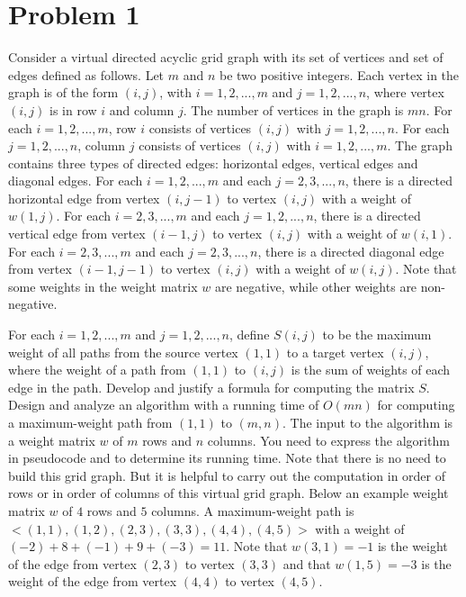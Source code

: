 \documentclass[12pt]{article}
\begin{document}
\section*{Problem 1}

Consider a virtual directed acyclic grid graph with its set of vertices and set of edges
defined as follows. Let $m$ and $n$ be two positive integers.
Each vertex in the graph is of the form $(i, j)$,
with $i = 1, 2, ..., m$ and $j = 1, 2, ..., n$, where vertex $(i, j)$
is in row $i$ and column $j$. The number of vertices in the graph is $mn$.
For each $i = 1, 2, ..., m$, row $i$ consists of 
vertices $(i, j)$ with $j = 1, 2, ..., n$.
For each $j = 1, 2, ..., n$, column $j$
consists of vertices $(i, j)$ with $i = 1, 2, ..., m$.
The graph contains three types of directed edges: horizontal edges, vertical edges
and diagonal edges. For each $i = 1, 2, ..., m$ and each $j = 2, 3, ..., n$,
there is a directed horizontal edge from vertex $(i, j-1)$ to vertex $(i, j)$ with a weight of $w(1, j)$.
For each $i = 2, 3, ..., m$ and each $j = 1, 2, ..., n$,
there is a directed vertical edge from vertex $(i-1, j)$ to vertex $(i, j)$ with a weight of $w(i, 1)$.
For each $i = 2, 3, ..., m$ and each $j = 2, 3, ..., n$,
there is a directed diagonal edge from vertex $(i-1, j-1)$ to vertex $(i, j)$
with a weight of $w(i, j)$.
Note that some weights in the weight matrix $w$ are negative,
while other weights are non-negative.

For each $i = 1, 2, ..., m$ and $j = 1, 2, ..., n$,
define $S(i, j)$ to be the maximum weight of all paths from the source vertex $(1, 1)$
to a target vertex $(i, j)$, where the weight of a path from $(1, 1)$
to $(i, j)$ is the sum of weights of each edge in the path.
Develop and justify a formula for computing the matrix $S$.
Design and analyze an algorithm with a running time of $O(mn)$
for computing a maximum-weight path from $(1, 1)$ to $(m, n)$.
The input to the algorithm is a weight matrix $w$ of $m$ rows and $n$ columns. 
You need to express the algorithm in pseudocode and to determine its running time.
Note that there is no need to build this grid graph. But it is helpful
to carry out the computation in order of rows or in order of columns of this virtual grid graph. 
Below an example weight matrix $w$ of $4$ rows and $5$ columns.
A maximum-weight path is $<(1, 1), (1, 2), (2, 3), (3, 3), (4, 4), (4, 5)>$
with a weight of $(-2) + 8 + (-1) + 9 + (-3) = 11$.
Note that $w(3, 1) = -1$ is the weight of the edge from vertex $(2, 3)$ to vertex $(3, 3)$
and  that $w(1, 5) = -3$ is the weight of the edge from vertex $(4, 4)$ to vertex $(4, 5)$.
\end{document}
